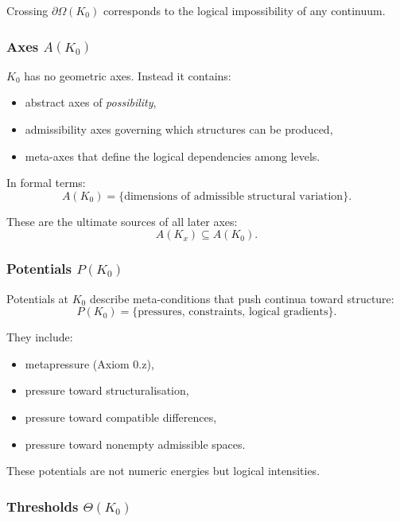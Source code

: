 Crossing $\partial\Omega(K_0)$ corresponds to the logical impossibility
of any continuum.

\subsubsection{Axes \texorpdfstring{$A(K_0)$}{A(K_0)}}

$K_0$ has no geometric axes. Instead it contains:
\begin{itemize}
    \item abstract axes of \emph{possibility},
    \item admissibility axes governing which structures can be produced,
    \item meta-axes that define the logical dependencies among levels.
\end{itemize}

In formal terms:
\[
A(K_0) = \{ \text{dimensions of admissible structural variation} \}.
\]

These are the ultimate sources of all later axes:
\[
A(K_x) \subseteq A(K_0).
\]

\subsubsection{Potentials \texorpdfstring{$P(K_0)$}{P(K_0)}}

Potentials at $K_0$ describe meta-conditions that push continua toward
structure:
\[
P(K_0) = \{ \text{pressures, constraints, logical gradients} \}.
\]

They include:
\begin{itemize}
    \item metapressure (Axiom 0.z),
    \item pressure toward structuralisation,
    \item pressure toward compatible differences,
    \item pressure toward nonempty admissible spaces.
\end{itemize}

These potentials are not numeric energies but logical intensities.

\subsubsection{Thresholds \texorpdfstring{$\Theta(K_0)$}{\Theta(K_0)}}

